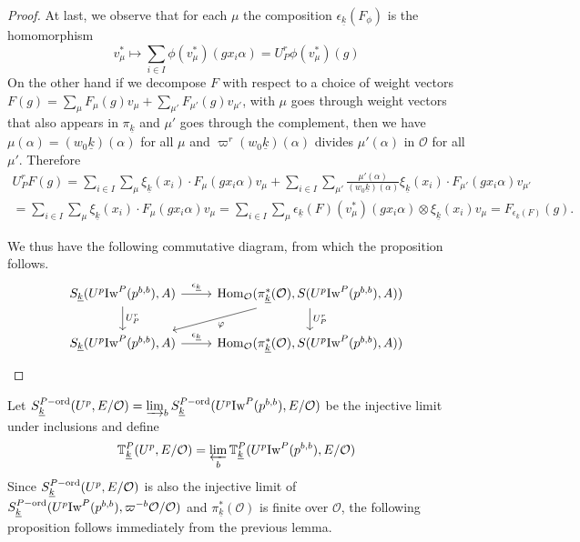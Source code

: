 \documentclass[leqno]{amsart}
\theoremstyle{definition}
\theoremstyle{remark}
\newcommand{\oo}{\mathcal{O}}
\DeclareMathOperator{\Hom}{Hom}
\newcommand{\wt}[1]{\underline{ #1 }}
\newcommand{\Iw}{\textnormal{Iw}} %
\newcommand{\TT}{\mathbb{T}} %
\newcommand{\ord}{\textnormal{ord}} %
\begin{document}
\begin{proof}
	At last, we observe that for each $\mu$ 
	the composition
	$\epsilon_{\wt{k}}(F_\phi)$ is the homomorphism
	\[
		v_\mu^*\mapsto \sum_{i\in I}\phi(v_\mu^*)
		(gx_i\alpha) =U_P^r\phi(v_\mu^*)(g)
	\]
	On the other hand 
	if we decompose $F$ with respect to a choice of 
	weight vectors
	$F(g)=\sum_\mu F_\mu(g)v_\mu+
	\sum_{\mu'}F_{\mu'}(g)v_{\mu'}$, 
	with $\mu$ goes through weight vectors 
	that also appears in $\pi_{\wt{k}}$
	and $\mu'$ goes through the complement,
	then we have
	$\mu(\alpha)=(w_0\wt{k})(\alpha)$ for all $\mu$
	and  $\varpi^r(w_0\wt{k})(\alpha)$ divides $\mu'(\alpha)$
	in $\oo$ for all $\mu'$.
	Therefore
	\begin{multline*}
	U_P^rF(g)=
	\sum_{i\in I}
	\sum_\mu \xi_{\wt{k}}(x_i)\cdot F_\mu(gx_i\alpha)v_\mu+
	\sum_{i\in I}
	\sum_{\mu'}\frac{\mu'(\alpha)}{(w_0\wt{k})(\alpha)}
	\xi_{\wt{k}}(x_i)\cdot F_{\mu'}(gx_i\alpha)v_{\mu'}\\=
	\sum_{i\in I}
	\sum_\mu \xi_{\wt{k}}(x_i)\cdot F_\mu(gx_i\alpha)v_\mu=
	\sum_{i\in I}
	\sum_\mu 
	\epsilon_{\wt{k}}(F)(v^*_\mu)(gx_i\alpha)\otimes
    \xi_{\wt{k}}(x_i)v_\mu
	=F_{\epsilon_{\wt{k}}(F)}(g).
	\end{multline*}

	We thus have the following commutative diagram,
	from which the proposition follows.
	\[
	\begin{tikzcd}
		S_{\wt{k}}(U^p\Iw^P(p^{b,b}),A)
		\arrow[r,"\epsilon_{\wt{k}}"]
		\arrow[d,"U_P^r"]
		& \Hom_\oo(\pi^*_{\wt{k}}(\oo), S(U^p\Iw^P(p^{b,b}),A))
		\arrow[d,"U_P^r"]
		\arrow[dl,"\varphi"]\\
		S_{\wt{k}}(U^p\Iw^P(p^{b,b}),A)
		\arrow[r,"\epsilon_{\wt{k}}"]
		& \Hom_\oo(\pi^*_{\wt{k}}(\oo), S(U^p\Iw^P(p^{b,b}),A))
	\end{tikzcd}	
	\]
\end{proof}


Let $S_{\wt{k}}^{P-\ord}(U^p,E/\oo)=
\varinjlim_{b}
S_{\wt{k}}^{P-\ord}(U^p\Iw^P(p^{b,b}),E/\oo)$
be the injective limit under inclusions
and define 
\[
	\TT^P_{\wt{k}}(U^p,E/\oo)=
	\varprojlim_{b}
	\TT^P_{\wt{k}}(U^p\Iw^P(p^{b,b}),E/\oo)
\]
Since $S_{\wt{k}}^{P-\ord}(U^p,E/\oo)$
is also the injective limit of 
$S_{\wt{k}}^{P-\ord}(U^p\Iw^P(p^{b,b}),\varpi^{-b}\oo/\oo)$
and $\pi_{\wt{k}}^*(\oo)$ is finite over $\oo$,
the following proposition
follows immediately from the previous lemma.
\end{document}

